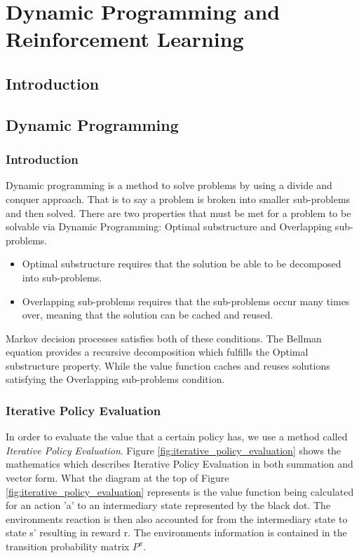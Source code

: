 \graphicspath{{RL/fig}}
\chapter{Dynamic Programming and Reinforcement Learning}
\label{chap:RL}

\section{Introduction}


\section{Dynamic Programming}
\subsection{Introduction}
Dynamic programming is a method to solve problems by using a divide and conquer approach. That is to say a problem is broken into smaller sub-problems and then solved.
There are two properties that must be met for a problem to be solvable via Dynamic Programming: Optimal substructure and Overlapping sub-problems. \cite{David_Silver}
\begin{itemize}
	\item Optimal substructure requires that the solution be able to be decomposed into sub-problems.
	\item Overlapping sub-problems requires that the sub-problems occur many times over, meaning that the solution can be cached and reused.
\end{itemize}

Markov decision processes satisfies both of these conditions. The Bellman equation provides a recursive decomposition which fulfills the Optimal substructure property. While the value function caches and reuses solutions satisfying the Overlapping sub-problems condition. \cite{David_Silver}\\

\subsection{Iterative Policy Evaluation}
In order to evaluate the value that a certain policy has, we use a method called \textit{Iterative Policy Evaluation}. Figure \ref{fig:iterative_policy_evaluation} shows the mathematics which describes Iterative Policy Evaluation in both summation and vector form. What the diagram  at the top of Figure \ref{fig:iterative_policy_evaluation} represents is the value function being calculated for an action 'a' to an intermediary state represented by the black dot. The environments reaction is then also accounted for from the intermediary state to state s' resulting in reward r. The environments information is contained in the transition probability matrix $P^\pi$.

